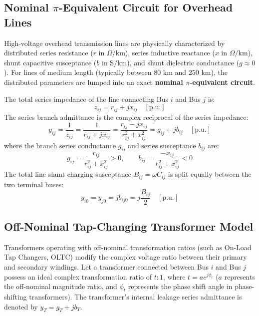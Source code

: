 \documentclass[12pt,a4paper,oneside]{report}
\begin{document}
\subsection{Nominal $\pi$-Equivalent Circuit for Overhead Lines}
High-voltage overhead transmission lines are physically characterized by distributed series resistance ($r$ in $\Omega/\text{km}$), series inductive reactance ($x$ in $\Omega/\text{km}$), shunt capacitive susceptance ($b$ in $\text{S}/\text{km}$), and shunt dielectric conductance ($g \approx 0$). For lines of medium length (typically between $80\text{ km}$ and $250\text{ km}$), the distributed parameters are lumped into an exact \textbf{nominal $\pi$-equivalent circuit}.

The total series impedance of the line connecting Bus $i$ and Bus $j$ is:
\begin{equation}
z_{ij} = r_{ij} + jx_{ij} \quad [\text{p.u.}]
\end{equation}
The series branch admittance is the complex reciprocal of the series impedance:
\begin{equation}
y_{ij} = \frac{1}{z_{ij}} = \frac{1}{r_{ij} + jx_{ij}} = \frac{r_{ij} - jx_{ij}}{r_{ij}^2 + x_{ij}^2} = g_{ij} + jb_{ij} \quad [\text{p.u.}]
\end{equation}
where the branch series conductance $g_{ij}$ and series susceptance $b_{ij}$ are:
\begin{equation}
g_{ij} = \frac{r_{ij}}{r_{ij}^2 + x_{ij}^2} > 0, \qquad b_{ij} = \frac{-x_{ij}}{r_{ij}^2 + x_{ij}^2} < 0
\end{equation}
The total line shunt charging susceptance $B_{ij} = \omega C_{ij}$ is split equally between the two terminal buses:
\begin{equation}
y_{i0} = y_{j0} = j b_{ij0} = j \frac{B_{ij}}{2} \quad [\text{p.u.}]
\end{equation}

\subsection{Off-Nominal Tap-Changing Transformer Model}
Transformers operating with off-nominal transformation ratios (such as On-Load Tap Changers, OLTC) modify the complex voltage ratio between their primary and secondary windings. Let a transformer connected between Bus $i$ and Bus $j$ possess an ideal complex transformation ratio of $t : 1$, where $t = a e^{j\phi_t}$ ($a$ represents the off-nominal magnitude ratio, and $\phi_t$ represents the phase shift angle in phase-shifting transformers). The transformer's internal leakage series admittance is denoted by $y_T = g_T + jb_T$.
\end{document}

